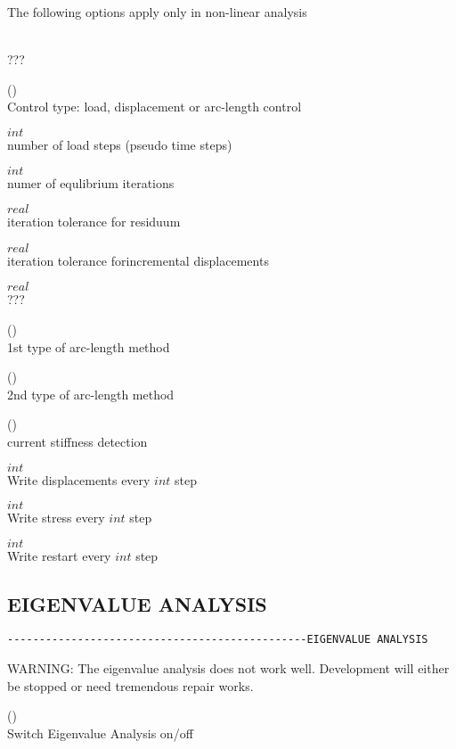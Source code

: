 The following options apply only in non-linear analysis

\\
???

 (\kor{}\kor{})\\
Control type: load, displacement or arc-length control

 $int$\\
number of load steps (pseudo time steps)

 $int$\\
numer of equlibrium iterations

 $real$\\
iteration tolerance for residuum

 $real$\\
iteration tolerance forincremental displacements 

 $real$\\
???

 (\kor{})\\
1st type of arc-length method

 (\kor{})\\
2nd type of arc-length method

 (\kor{})\\
current stiffness detection

 $int$\\
Write displacements every $int$ step 

 $int$\\
Write stress every $int$ step

 $int$\\
Write restart every $int$ step


\subsection{EIGENVALUE ANALYSIS}
\begin{verbatim}
-----------------------------------------------EIGENVALUE ANALYSIS
\end{verbatim}

WARNING: The eigenvalue analysis does not work well. Development will either
be stopped or need tremendous repair works.

 (\kor{})\\
Switch Eigenvalue Analysis on/off

